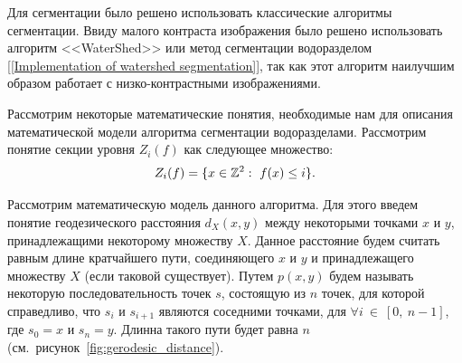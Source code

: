 \documentclass[14pt, a4paper]{extreport}
\begin{document}
	Для сегментации было решено использовать классические алгоритмы сегментации. Ввиду малого контраста изображения было решено использовать алгоритм <<WaterShed>> или метод сегментации водоразделом [\ref{Implementation of watershed segmentation}], так как этот алгоритм наилучшим образом работает с низко-контрастными изображениями.
	
	Рассмотрим некоторые математические понятия, необходимые нам для описания математической модели алгоритма сегментации водоразделами. Рассмотрим понятие секции уровня $Z_i(f)$ как следующее множество:\vspace*{-0.3cm}
	\begin{equation*}
		Z_i(f) = \{x\in \mathbb{Z}^2:~f(x)\le i\}.
		\vspace*{-0.3cm}
		\label{Z_i(f)}
	\end{equation*}
	
	Рассмотрим математическую модель данного алгоритма. Для этого введем понятие геодезического расстояния $d_X(x,y)$ между некоторыми точками $x$ и $y$, принадлежащими некоторому множеству $X$. Данное расстояние будем считать равным длине кратчайшего пути, соединяющего $x$ и $y$ и принадлежащего множеству $X$ (если таковой существует). Путем $p(x,y)$ будем называть некоторую последовательность точек $s$, состоящую из $n$ точек, для которой справедливо, что $s_i$ и $s_{i+1}$ являются соседними точками, для $\forall i~\in~[0,~n-1]$, где $s_0 = x$ и $s_n = y$. Длинна такого пути будет равна $n$ (см.~рисунок~\ref{fig:gerodesic_distance}).
	
\end{document}

